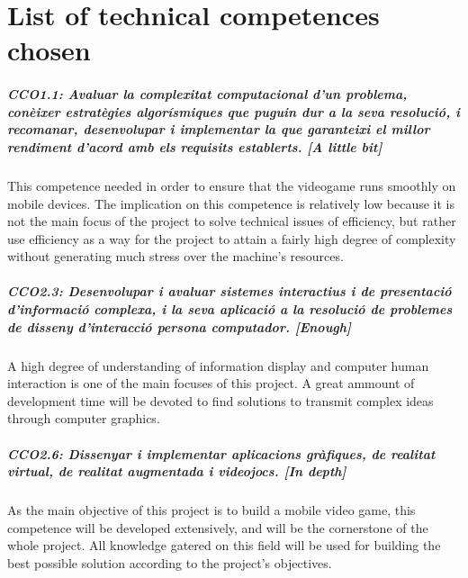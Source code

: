 \chapter{List of technical competences chosen}


\paragraph{CCO1.1: Avaluar la complexitat computacional d'un problema, conèixer estratègies algorísmiques que puguin dur a la seva resolució, i recomanar, desenvolupar i implementar la que garanteixi el millor rendiment d'acord amb els requisits establerts. [A little bit]}
This competence needed in order to ensure that the videogame runs smoothly
on mobile devices. The implication on this competence is relatively low
because it is not the main focus of the project to solve technical issues of
efficiency, but rather use efficiency as a way for the project to attain a
fairly high degree of complexity without generating much stress over the
machine's resources.

\paragraph{CCO2.3: Desenvolupar i avaluar sistemes interactius i de presentació d'informació complexa, i la seva aplicació a la resolució de problemes de disseny d'interacció persona computador. [Enough]}
A high degree of understanding of information display and computer human interaction
is one of the main focuses of this project. A great ammount of development
time will be devoted to find solutions to transmit complex ideas through
computer graphics.

\paragraph{CCO2.6: Dissenyar i implementar aplicacions gràfiques, de realitat virtual, de realitat augmentada i videojocs. [In depth]}
As the main objective of this project is to build a mobile video game, this
competence will be developed extensively, and will be the cornerstone of
the whole project. All knowledge gatered on this field will be used for building
the best possible solution according to the project's objectives.

